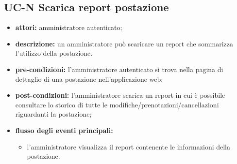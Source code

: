 \subsection{UC-N Scarica report postazione}
\begin{itemize}
    \item \textbf{attori:} amministratore autenticato;
    \item \textbf{descrizione:} un amministratore pu\`{o} scaricare un report che sommarizza l'utilizzo della postazione.
    \item \textbf{pre-condizioni:} l'amministratore autenticato si trova nella pagina di dettaglio di una postazione nell'applicazione web;
    \item \textbf{post-condizioni:} l'amministratore scarica un report in cui \`{e} possibile consultare lo storico di tutte le modifiche/prenotazioni/cancellazioni riguardanti la postazione;
    \item \textbf{flusso degli eventi principali:}
    \begin{itemize}
        \item l'amministratore visualizza il report contenente le informazioni della postazione.
    \end{itemize}
\end{itemize}